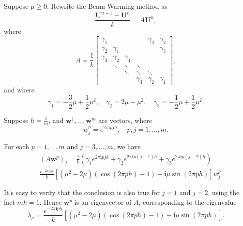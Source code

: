\documentclass[twocolumn,10pt]{article}
\begin{document}
Suppose $\mu\geq 0$. Rewrite the Beam-Warming method as
\begin{equation*}
    \frac{\mathbf{U}^{n+1}-\mathbf{U}^n}{k}=A\mathbf{U}^n,
\end{equation*}
where
\begin{equation*}
    A=\frac{1}{k}\begin{bmatrix}
        \gamma_1 &          &          &          & \gamma_3 & \gamma_2\\
        \gamma_2 & \gamma_1 &          &          &          & \gamma_3\\
        \gamma_3 & \gamma_2 & \gamma_1 & \\
                 & \ddots   & \ddots   & \ddots\\
                 &          & \ddots   & \ddots   & \ddots\\
                 &          &          & \gamma_3 & \gamma_2 & \gamma_1
    \end{bmatrix},
\end{equation*}
and where
\begin{equation*}
    \gamma_1=-\frac{3}{2}\mu+\frac{1}{2}\mu^2,\quad \gamma_2=2\mu-\mu^2,\quad \gamma_3=-\frac{1}{2}\mu+\frac{1}{2}\mu^2.
\end{equation*}

Suppose $h=\frac{1}{m}$, and $\mathbf{w}^1,...,\mathbf{w}^m$ are vectors, where
\begin{equation*}
    w_j^p=e^{2\pi\mathbf{i}pjh},\quad p,j=1,...,m.
\end{equation*}

For each $p=1,...,m$ and $j=3,...,m$, we have
\begin{align*}
    &(A\mathbf{w}^p)_j = \frac{1}{k}\left(\gamma_1e^{2\pi\mathbf{i}pjh} + \gamma_2e^{2\pi\mathbf{i}p(j-1)h} + \gamma_3e^{2\pi\mathbf{i}p(j-2)h}\right)\\
    =& \frac{e^{-2\pi\mathbf{i}ph}}{k}\left[(\mu^2-2\mu)(\cos(2\pi ph)-1)-\mathbf{i}\mu\sin(2\pi ph)\right]w^p_j.
\end{align*}

It's easy to verify that the conclusion is also true for $j=1$ and $j=2$, using the fact $mh=1$. Hence $\mathbf{w}^p$ is an eigenvector of $A$, corresponding to the eigenvalue
\begin{equation*}
    \lambda_p=\frac{e^{-2\pi\mathbf{i}ph}}{k}\left[(\mu^2-2\mu)(\cos(2\pi ph)-1)-\mathbf{i}\mu\sin(2\pi ph)\right].
\end{equation*}
\end{document}
